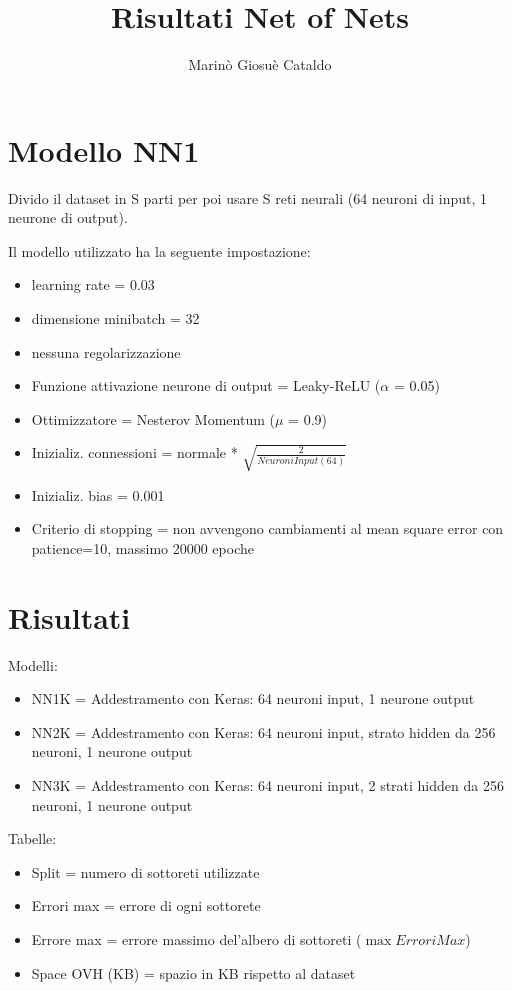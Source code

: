 \documentclass[]{article}
\title{Risultati Net of Nets}
\author{Marinò Giosuè Cataldo}
\begin{document}
	
	\section{Modello NN1}
	Divido il dataset in S parti per poi usare S reti neurali (64 neuroni di input, 1 neurone di output).
	
	Il modello utilizzato ha la seguente impostazione:
	\begin{itemize}
		\item learning rate = 0.03
		\item dimensione minibatch = 32
		\item nessuna regolarizzazione
		\item Funzione attivazione neurone di output = Leaky-ReLU ($\alpha$ = 0.05)
		\item Ottimizzatore = Nesterov Momentum ($\mu$ = 0.9)
		\item Inizializ. connessioni = normale * $\sqrt{\frac{2}{NeuroniInput(64)}}$		
		\item Inizializ. bias = 0.001
		\item Criterio di stopping = non avvengono cambiamenti al mean square error con patience=10, massimo 20000 epoche
	\end{itemize}
	
	


\section{Risultati}
	Modelli:
	\begin{itemize}
		\item NN1K = Addestramento con Keras: 64 neuroni input, 1 neurone output
		\item NN2K = Addestramento con Keras: 64 neuroni input, strato hidden da 256 neuroni, 1 neurone output
		\item NN3K = Addestramento con Keras: 64 neuroni input, 2 strati hidden da 256 neuroni, 1 neurone output
	\end{itemize}
	Tabelle:
	\begin{itemize}
		\item Split = numero di sottoreti utilizzate
		\item Errori max = errore di ogni sottorete
		\item Errore max = errore massimo del'albero di sottoreti ($\max{ErroriMax}$)
		\item Space OVH (KB) = spazio in KB rispetto al dataset
	\end{itemize}
	
\end{document}
